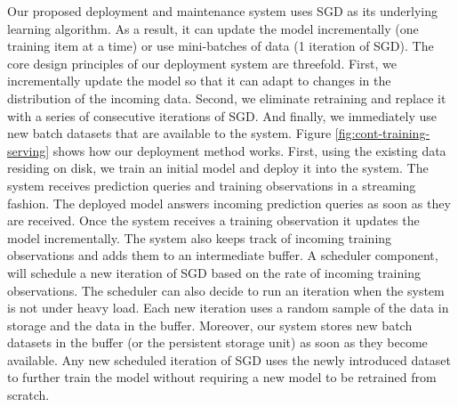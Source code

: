 \documentclass{vldb}
\begin{document}
Our proposed deployment and maintenance system uses SGD as its underlying learning algorithm.
As a result, it can update the model incrementally (one training item at a time) or use mini-batches of data (1 iteration of SGD).
The core design principles of our deployment system are threefold.
First, we incrementally update the model so that it can adapt to changes in the distribution of the incoming data.
Second, we eliminate retraining and replace it with a series of consecutive iterations of SGD.
And finally, we immediately use new batch datasets that are available to the system.
Figure \ref{fig:cont-training-serving} shows how our deployment method works.
First, using the existing data residing on disk, we train an initial model and deploy it into the system.
The system receives prediction queries and training observations in a streaming fashion.
The deployed model answers incoming prediction queries as soon as they are received.
Once the system receives a training observation it updates the model incrementally.
The system also keeps track of incoming training observations and adds them to an intermediate buffer.
A scheduler component, will schedule a new iteration of SGD based on the rate of incoming training observations. 
The scheduler can also decide to run an iteration when the system is not under heavy load.
Each new iteration uses a random sample of the data in storage and the data in the buffer. 
Moreover, our system stores new batch datasets in the buffer (or the persistent storage unit) as soon as they become available.
Any new scheduled iteration of SGD uses the newly introduced dataset to further train the model without requiring a new model to be retrained from scratch.
\end{document}
